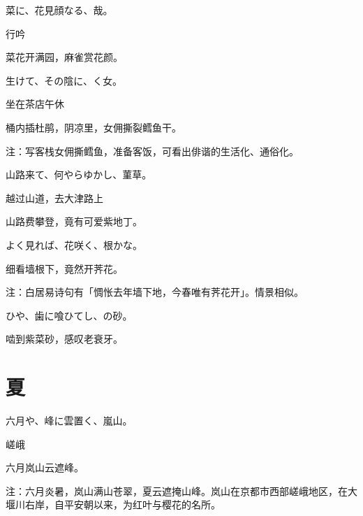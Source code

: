 \begin{haiku}
    {\FH 菜に、花見顔なる、哉。}

    {\FK 行吟}

    {\FK 菜花开满园，麻雀赏花颜。}
\end{haiku}

\begin{haiku}
    {\FH {}生けて、その陰に、く女。}

    {\FK 坐在茶店午休}

    {\FK 桶内插杜鹃，阴凉里，女佣撕裂鳕鱼干。}

    {\FT 注：写客栈女佣撕鳕鱼，准备客饭，可看出俳谐的生活化、通俗化。}
\end{haiku}

\begin{haiku}
    {\FH 山路来て、何やらゆかし、菫草。}

    {\FK 越过山道，去大津路上}

    {\FK 山路费攀登，竟有可爱紫地丁。}
\end{haiku}

\begin{haiku}
    {\FH よく見れば、花咲く、根かな。}

    {\FK 细看墙根下，竟然开荠花。}

    {\FT 注：白居易诗句有「惆怅去年墙下地，今春唯有荠花开」。情景相似。}
\end{haiku}

\begin{haiku}
    {\FH {}ひや、歯に喰ひてし、の砂。}

    {\FK 啮到紫菜砂，感叹老衰牙。}
\end{haiku}

\section{\FK 夏}

\setcounter{haikucounter}{0}

\begin{haiku}
    {\FH 六月や、峰に雲置く、嵐山。}

    {\FK 嵯峨}

    {\FK 六月岚山云遮峰。}

    {\FT 注：六月炎暑，岚山满山苍翠，夏云遮掩山峰。岚山在京都市西部嵯峨地区，在大堰川右岸，自平安朝以来，为红叶与樱花的名所。}
\end{haiku}

